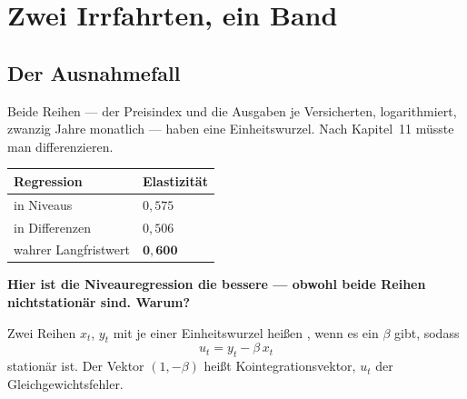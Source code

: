\chapter{Zwei Irrfahrten, ein Band}

\section{Der Ausnahmefall}

\begin{merksatz}
Beide Reihen --- der Preisindex und die Ausgaben je Versicherten, logarithmiert, zwanzig Jahre monatlich --- haben eine Einheitswurzel. Nach Kapitel~11 müsste man differenzieren.

\begin{center}
{\small
\renewcommand{\arraystretch}{1.48}
\begin{tabular}{@{}P{3.6cm}P{2.4cm}@{}}
\toprule
\textbf{Regression} & \textbf{Elastizität}\\
\midrule
in Niveaus & $0{,}575$\\
in Differenzen & $0{,}506$\\
\midrule
wahrer Langfristwert & $\mathbf{0{,}600}$\\
\bottomrule
\end{tabular}}
\end{center}

\begin{center}
\begin{minipage}{0.9\textwidth}
\textbf{Hier ist die Niveauregression die bessere --- obwohl beide Reihen nichtstationär sind. Warum?}
\end{minipage}
\end{center}

\begin{center}
\begin{minipage}{0.88\textwidth}
\end{minipage}
\end{center}
\end{merksatz}

\begin{definition}
Zwei Reihen $x_t$, $y_t$ mit je einer Einheitswurzel heißen , wenn es ein $\beta$ gibt, sodass
\[ u_t = y_t - \beta\,x_t \]
stationär ist. Der Vektor $(1,-\beta)$ heißt Kointegrationsvektor, $u_t$ der Gleichgewichtsfehler.
\end{definition}

